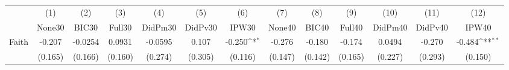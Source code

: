 {
\def\sym#1{\ifmmode^{#1}\else\(^{#1}\)\fi}
\begin{tabular}{l*{12}{c}}
\toprule
            &\multicolumn{1}{c}{(1)}&\multicolumn{1}{c}{(2)}&\multicolumn{1}{c}{(3)}&\multicolumn{1}{c}{(4)}&\multicolumn{1}{c}{(5)}&\multicolumn{1}{c}{(6)}&\multicolumn{1}{c}{(7)}&\multicolumn{1}{c}{(8)}&\multicolumn{1}{c}{(9)}&\multicolumn{1}{c}{(10)}&\multicolumn{1}{c}{(11)}&\multicolumn{1}{c}{(12)}\\
            &\multicolumn{1}{c}{None30}&\multicolumn{1}{c}{BIC30}&\multicolumn{1}{c}{Full30}&\multicolumn{1}{c}{DidPm30}&\multicolumn{1}{c}{DidPv30}&\multicolumn{1}{c}{IPW30}&\multicolumn{1}{c}{None40}&\multicolumn{1}{c}{BIC40}&\multicolumn{1}{c}{Full40}&\multicolumn{1}{c}{DidPm40}&\multicolumn{1}{c}{DidPv40}&\multicolumn{1}{c}{IPW40}\\
\midrule
Faith       &      -0.207         &     -0.0254         &      0.0931         &     -0.0595         &       0.107         &      -0.250\sym{*}  &      -0.276         &      -0.180         &      -0.174         &      0.0494         &      -0.270         &      -0.484\sym{**} \\
            &     (0.165)         &     (0.166)         &     (0.160)         &     (0.274)         &     (0.305)         &     (0.116)         &     (0.147)         &     (0.142)         &     (0.165)         &     (0.227)         &     (0.293)         &     (0.150)         \\
\bottomrule
\end{tabular}
}
